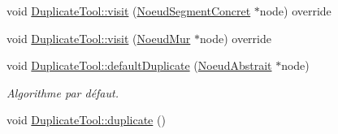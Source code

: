 \begin{DoxyCompactItemize}
\item 
void \hyperlink{group__inf2990_gaa8f5663adbfe6f00a2c2f79083339e30}{Duplicate\-Tool\-::visit} (\hyperlink{class_noeud_segment_concret}{Noeud\-Segment\-Concret} $\ast$node) override
\item 
void \hyperlink{group__inf2990_ga9b9e4456490e59603f3d8924fdf19c18}{Duplicate\-Tool\-::visit} (\hyperlink{class_noeud_mur}{Noeud\-Mur} $\ast$node) override
\item 
void \hyperlink{group__inf2990_ga4708caab32b10170d24dba25d4829677}{Duplicate\-Tool\-::default\-Duplicate} (\hyperlink{class_noeud_abstrait}{Noeud\-Abstrait} $\ast$node)
\begin{DoxyCompactList}\small\item\em Algorithme par défaut. \end{DoxyCompactList}\item 
\hypertarget{group__inf2990_gadbe76417e934ddabc6df18141162fe2c}{void \hyperlink{group__inf2990_gadbe76417e934ddabc6df18141162fe2c}{Duplicate\-Tool\-::duplicate} ()}\label{group__inf2990_gadbe76417e934ddabc6df18141162fe2c}


\end{DoxyCompactItemize}
